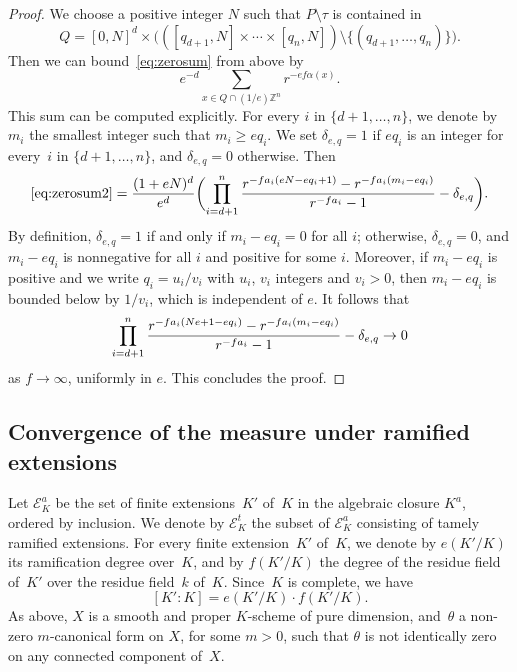 \documentclass[JEP,XML,SOM,Unicode,NoFloatCountersInSection]{cedram}
\let\mathcal\mathscr
\theoremstyle{definition}
\numberwithin{equation}{subsection}
\newcommand{\Z}{\ensuremath{\mathbb{Z}}}
\let\form\theta
\begin{document}
\begin{proof}
We choose a positive integer $N$ such that
$P\setminus \tau$ is contained in
\[
Q=[0,N]^{d}\times \bigl(([q_{d+1},N]\times \cdots \times [q_{n},N])\setminus \{(q_{d+1},\ldots,q_n)\}\bigr).
\]
Then we can bound~\eqref{eq:zerosum} from above by
\begin{equation}\label{eq:zerosum2}
e^{-d}\sum_{x\in Q\cap (1/e)\Z^n}r^{-ef\alpha(x)}.
\end{equation}
This sum can be computed explicitly. For every $i$ in $\{d+1,\ldots,n\}$, we denote by $m_i$ the smallest integer such that
$m_i\geq eq_i$. We set $\delta_{e,q}=1$ if $eq_i$ is an integer for every~$i$ in $\{d+1,\ldots,n\}$, and $\delta_{e,q}=0$ otherwise. Then
\[
\eqref{eq:zerosum2}=\frac{(1+eN)^d}{e^d}\biggl( \prod_{i=d+1}^{n}\frac{r^{-fa_i(eN-eq_i+1)}- r^{-fa_i(m_i-eq_i)}}{r^{-fa_i}-1} - \delta_{e,q}\biggr).
\]
By definition, $\delta_{e,q}=1$ if and only if $m_i-eq_i=0$ for all $i$; otherwise, $\delta_{e,q}=0$, and $m_i-eq_i$ is nonnegative for all $i$ and positive for some $i$. Moreover, if $m_i-eq_i$ is positive and we write $q_i=u_i/v_i$ with $u_i$, $v_i$ integers and $v_i>0$, then $m_i-eq_i$ is bounded below by $1/v_i$, which is independent of $e$.
It follows that\vspace*{-3pt}
\[
\prod_{i=d+1}^{n}\frac{r^{-fa_i(Ne+1-eq_i)}- r^{-fa_i(m_i-eq_i)}}{r^{-fa_i}-1} - \delta_{e,q} \to 0\vspace*{-3pt}
\]
as $f\to \infty$, uniformly in $e$. This concludes the proof.
\end{proof}

\subsection{Convergence of the measure under ramified extensions}
Let $\mathcal{E}^a_K$ be the set of finite extensions~$K'$ of~$K$ in the algebraic closure $K^a$, ordered by inclusion. We denote by
$\mathcal{E}^t_K$ the subset of $\mathcal{E}^a_K$ consisting of tamely ramified extensions.
For every finite extension~$K'$ of~$K$, we denote by $e(K'/K)$ its ramification degree over~$K$, and by $f(K'/K)$ the degree of the residue field of~$K'$ over the residue field~$k$ of~$K$. Since~$K$ is complete, we have\vspace*{-3pt}
\[
[K'\colon K]=e(K'/K)\cdot f(K'/K).
\]
As above, $X$ is a smooth and proper $K$\nobreakdash-scheme of pure dimension, and~$\form$ a non-zero $m$-canonical form on $X$, for some $m>0$, such that
$\form$ is not identically zero on any connected component of~$X$.
\end{document}
